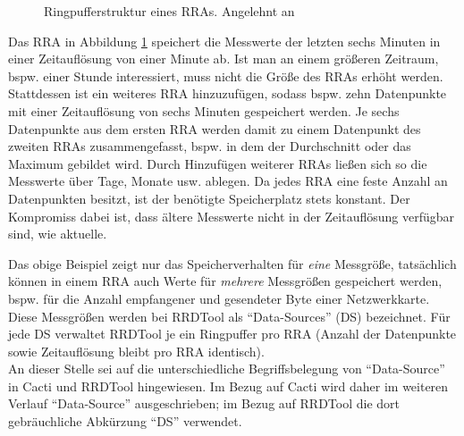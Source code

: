 \documentclass[12pt,ngerman,toc=listofnumbered,toc=bibliographynumbered,toc=index,headsepline=true]{scrbook}
\begin{document}
\begin{figure}[ht]
  \centering
  \caption[Ringpufferstruktur eines RRAs]{Ringpufferstruktur eines RRAs.
  Angelehnt an \cite{Schilli04}}
  \label{fig:roundrobin}
\end{figure}

Das RRA in Abbildung \ref{fig:roundrobin} speichert die Messwerte der letzten
sechs Minuten in einer Zeitauflösung von einer Minute ab. Ist man an einem
größeren Zeitraum, bspw. einer Stunde interessiert, muss nicht die Größe des
RRAs erhöht werden. Stattdessen ist ein weiteres RRA hinzuzufügen, sodass
bspw. zehn Datenpunkte mit einer Zeitauflösung von sechs Minuten gespeichert
werden. Je sechs Datenpunkte aus dem ersten RRA werden damit zu einem Datenpunkt
des zweiten RRAs zusammengefasst, bspw. in dem der Durchschnitt oder das Maximum
gebildet wird. Durch Hinzufügen weiterer RRAs ließen sich so die Messwerte über
Tage, Monate usw. ablegen. Da jedes RRA eine feste Anzahl an Datenpunkten
besitzt, ist der benötigte Speicherplatz stets konstant. Der Kompromiss dabei
ist, dass ältere Messwerte nicht in der Zeitauflösung verfügbar sind, wie
aktuelle.

Das obige Beispiel zeigt nur das Speicherverhalten für \textit{eine}
Messgröße, tatsächlich können in einem RRA auch Werte für \textit{mehrere}
Messgrößen gespeichert werden, bspw. für die Anzahl empfangener und gesendeter
Byte einer Netzwerkkarte. Diese Messgrößen werden bei RRDTool als
\enquote{Data-Sources} (DS) bezeichnet. Für jede DS verwaltet RRDTool je ein
Ringpuffer pro RRA (Anzahl der Datenpunkte sowie Zeitauflösung bleibt pro RRA
identisch).\\
An dieser Stelle sei auf die unterschiedliche Begriffsbelegung von
\enquote{Data-Source} in Cacti und RRDTool hingewiesen. Im Bezug auf Cacti wird
daher im weiteren Verlauf \enquote{Data-Source} ausgeschrieben; im Bezug auf
RRDTool die dort gebräuchliche Abkürzung \enquote{DS} verwendet.
\end{document}
